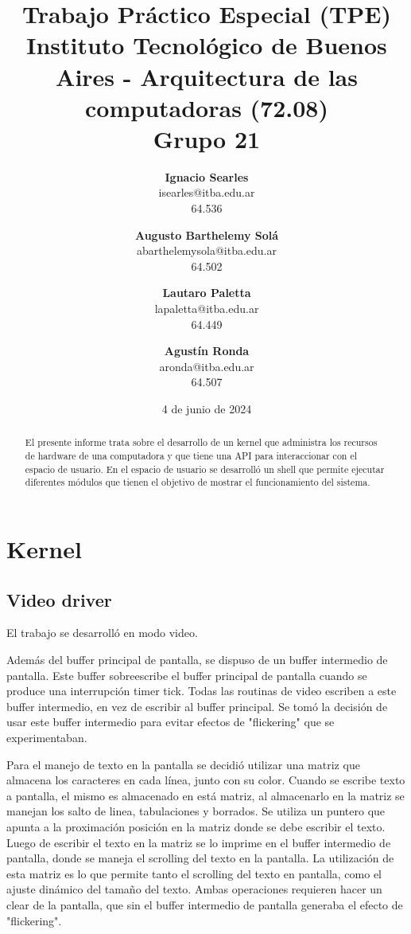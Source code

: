 \documentclass{article}
\title{\textbf{Trabajo Práctico Especial (TPE)} \\ [1ex]
\large Instituto Tecnológico de Buenos Aires - Arquitectura de las computadoras (72.08) \\ [1ex]
\large Grupo 21 }
\date{4 de junio de 2024}
\author{
\textbf{Ignacio Searles}\\
isearles@itba.edu.ar\\
64.536
\and
\textbf{Augusto Barthelemy Solá}\\
abarthelemysola@itba.edu.ar\\
64.502
\and
\textbf{Lautaro Paletta}\\
lapaletta@itba.edu.ar\\
64.449
\and
\textbf{Agustín Ronda}\\
aronda@itba.edu.ar\\
64.507
}
\begin{document}
\maketitle

\begin {abstract}

El presente informe trata sobre el desarrollo de un kernel que administra los recursos de hardware de una computadora y que tiene una API para interaccionar con el espacio de usuario. En el espacio de usuario se desarrolló un shell que permite ejecutar diferentes módulos que tienen el objetivo de mostrar el funcionamiento del sistema.

\end {abstract}

\section {Kernel}

\subsection {Video driver}

El trabajo se desarrolló en modo video.

Además del buffer principal de pantalla, se dispuso de un buffer intermedio de pantalla. Este buffer sobreescribe el buffer principal de pantalla cuando se produce una interrupción timer tick. Todas las routinas de video escriben a este buffer intermedio, en vez de escribir al buffer principal. Se tomó la decisión de usar este buffer intermedio para evitar efectos de "flickering" que se experimentaban.

Para el manejo de texto en la pantalla se decidió utilizar una matriz que almacena los caracteres en cada línea, junto con su color. Cuando se escribe texto a pantalla, el mismo es almacenado en está matriz, al almacenarlo en la matriz se manejan los salto de linea, tabulaciones y borrados. Se utiliza un puntero que apunta a la proximación posición en la matriz donde se debe escribir el texto. Luego de escribir el texto en la matriz se lo imprime en el buffer intermedio de pantalla, donde se maneja el scrolling del texto en la pantalla. La utilización de esta matriz es lo que permite tanto el scrolling del texto en pantalla, como el ajuste dinámico del tamaño del texto. Ambas operaciones requieren hacer un clear de la pantalla, que sin el buffer intermedio de pantalla generaba el efecto de "flickering".
\end{document}
